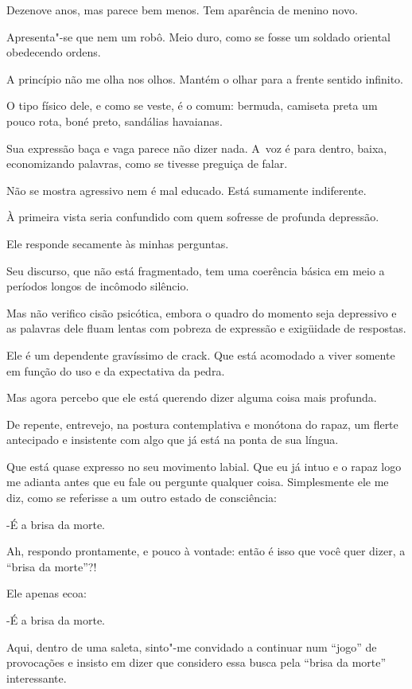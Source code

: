  

Dezenove anos, mas parece bem menos. Tem aparência de menino novo.

Apresenta"-se que nem um robô. Meio duro, como se fosse um soldado
oriental obedecendo ordens.

A princípio não me olha nos olhos. Mantém o olhar para a frente sentido
infinito.

O tipo físico dele, e como se veste, é o comum: bermuda, camiseta preta
um pouco rota, boné preto, sandálias havaianas.

Sua expressão baça e vaga parece não dizer nada. A~voz é para dentro,
baixa, economizando palavras, como se tivesse preguiça de falar.

Não se mostra agressivo nem é mal educado. Está sumamente indiferente.

À primeira vista seria confundido com quem sofresse de profunda
depressão.

Ele responde secamente às minhas perguntas.

Seu discurso, que não está fragmentado, tem uma coerência básica em meio
a períodos longos de incômodo silêncio.

Mas não verifico cisão psicótica, embora o quadro do momento seja
depressivo e as palavras dele fluam lentas com pobreza de expressão e
exigüidade de respostas.

Ele é um dependente gravíssimo de crack. Que está acomodado a viver
somente em função do uso e da expectativa da pedra.

Mas agora percebo que ele está querendo dizer alguma coisa mais
profunda.

De repente, entrevejo, na postura contemplativa e monótona do rapaz, um
flerte antecipado e insistente com algo que já está na ponta de sua
língua.

Que está quase expresso no seu movimento labial. Que eu já intuo e o
rapaz logo me adianta antes que eu fale ou pergunte qualquer coisa.
Simplesmente ele me diz, como se referisse a um outro estado de
consciência:

-É a brisa da morte.

Ah, respondo prontamente, e pouco à vontade: então é isso que você quer
dizer, a ``brisa da morte''?!

Ele apenas ecoa:

-É a brisa da morte.

Aqui, dentro de uma saleta, sinto"-me convidado a continuar num ``jogo''
de provocações e insisto em dizer que considero essa busca pela ``brisa
da morte'' interessante.

